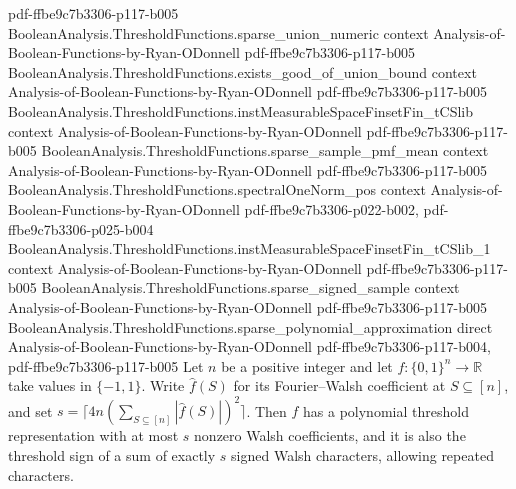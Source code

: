 \begin{theorem}
  {pdf-ffbe9c7b3306-p117-b005}
\proofstep
  {BooleanAnalysis.ThresholdFunctions.sparse_union_numeric}
  {context}
  {Analysis-of-Boolean-Functions-by-Ryan-ODonnell}
  {pdf-ffbe9c7b3306-p117-b005}
\proofstep
  {BooleanAnalysis.ThresholdFunctions.exists_good_of_union_bound}
  {context}
  {Analysis-of-Boolean-Functions-by-Ryan-ODonnell}
  {pdf-ffbe9c7b3306-p117-b005}
\proofstep
  {BooleanAnalysis.ThresholdFunctions.instMeasurableSpaceFinsetFin_tCSlib}
  {context}
  {Analysis-of-Boolean-Functions-by-Ryan-ODonnell}
  {pdf-ffbe9c7b3306-p117-b005}
\proofstep
  {BooleanAnalysis.ThresholdFunctions.sparse_sample_pmf_mean}
  {context}
  {Analysis-of-Boolean-Functions-by-Ryan-ODonnell}
  {pdf-ffbe9c7b3306-p117-b005}
\proofstep
  {BooleanAnalysis.ThresholdFunctions.spectralOneNorm_pos}
  {context}
  {Analysis-of-Boolean-Functions-by-Ryan-ODonnell}
  {pdf-ffbe9c7b3306-p022-b002,
    pdf-ffbe9c7b3306-p025-b004}
\proofstep
  {BooleanAnalysis.ThresholdFunctions.instMeasurableSpaceFinsetFin_tCSlib_1}
  {context}
  {Analysis-of-Boolean-Functions-by-Ryan-ODonnell}
  {pdf-ffbe9c7b3306-p117-b005}
\proofstep
  {BooleanAnalysis.ThresholdFunctions.sparse_signed_sample}
  {context}
  {Analysis-of-Boolean-Functions-by-Ryan-ODonnell}
  {pdf-ffbe9c7b3306-p117-b005}
\proofstep
  {BooleanAnalysis.ThresholdFunctions.sparse_polynomial_approximation}
  {direct}
  {Analysis-of-Boolean-Functions-by-Ryan-ODonnell}
  {pdf-ffbe9c7b3306-p117-b004,
    pdf-ffbe9c7b3306-p117-b005}
Let $n$ be a positive integer and let $f:\{0,1\}^n\to\mathbb R$ take values in
$\{-1,1\}$. Write $\widehat f(S)$ for its Fourier–Walsh coefficient at $S\subseteq[n]$,
and set $s=\lceil 4n(\sum_{S\subseteq[n]}|\widehat f(S)|)^2\rceil$. Then $f$ has a
polynomial threshold representation with at most $s$ nonzero Walsh coefficients, and it
is also the threshold sign of a sum of exactly $s$ signed Walsh characters, allowing
repeated characters.
\end{theorem}

